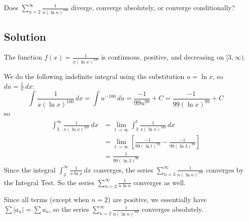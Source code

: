 \documentclass{article}
\begin{document}
\noindent
Does $\displaystyle \sum_{n=2}^\infty \frac{1}{n (\ln n)^{100}}$
diverge, converge absolutely, or converge conditionally?


\subsection*{Solution}

The function $f(x)=\frac{1}{x (\ln x)^{100}}$ is continuous, positive, and decreasing on $[3,\infty)$.

We do the following indefinite integral using the substitution $u= \ln x$, so $du = \frac1x\,dx$:
\[
\int \frac{1}{x (\ln x)^{100}}\,dx
= \int u^{-100}\,du = \frac{-1}{99u^{99}} + C = \frac{-1}{99(\ln x)^{99}} + C
\]
so
\begin{align*}
\int_3^\infty \frac1{x (\ln x)^{100}}\,dx 
&= \lim_{t \to \infty} \int_3^t \frac1{x(\ln x)^{100}}\,dx\\
&= \lim_{t \to \infty}\left[   \frac{-1}{99(\ln t)^{99}} -  \frac{-1}{99(\ln 3)^{99}}  \right] \\
&= \frac{1}{99(\ln 3)^{99}}
\end{align*}
Since the integral $\displaystyle  \int_3^\infty \frac{1}{x \ln x}\,dx$ converges, the series  $\displaystyle \sum_{n=3}^\infty \frac{1}{n (\ln n)^{100}}$ converges by the Integral Test. So the series $\displaystyle \sum_{n=2}^\infty \frac{1}{n \ln n}$ converges as well.

Since all terms (except when $n=2$) are positive, we essentially have  $\sum |a_n| = \sum a_n$, so the series $\displaystyle \sum_{n=2}^\infty \frac{1}{n (\ln n)^{100}}$ converges absolutely.
\end{document}
